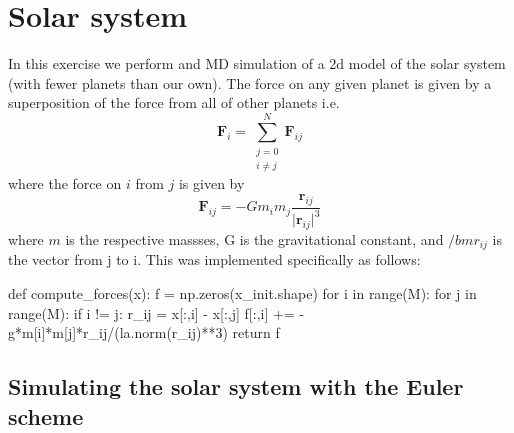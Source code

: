 \documentclass[a4paper,11pt,bibtotoc]{scrartcl}
\begin{document}
\section{Solar system}

In this exercise we perform and MD simulation of a 2d model of the solar system (with fewer planets than our own). The force on any given planet is given by a superposition of the force from all of other planets i.e.
\begin{equation}
	\bm{F}_i = \sum_{\substack{j=0 \\ i \neq j}}^N \bm{F}_{ij}
\end{equation}
where the force on $i$ from $j$ is given by
\begin{equation}
	\bm{F}_{ij} = -Gm_i m_j \frac{\bm{r}_{ij}}{\lvert\bm{r}_{ij}\rvert^3}
\end{equation}
where $m$ is the respective massses, G is the gravitational constant, and $/bm{r}_{ij}$ is the vector from j to i. This was implemented specifically as follows:
\begin{python}
def compute_forces(x):
    f = np.zeros(x_init.shape)
    for i in range(M):
        for j in range(M):
            if i != j:
                r_ij = x[:,i] - x[:,j]
                f[:,i] += -g*m[i]*m[j]*r_ij/(la.norm(r_ij)**3)
    return f
\end{python}
\subsection{Simulating the solar system with the Euler scheme}
\end{document}
